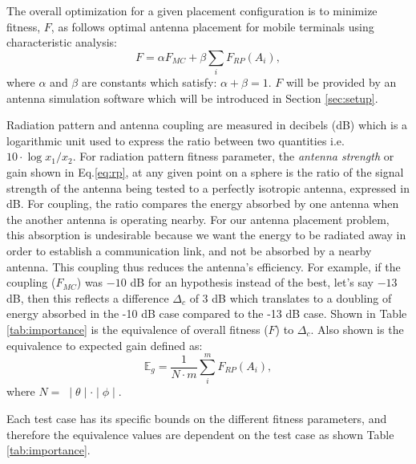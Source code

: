 \documentclass{sig-alternate}
\begin{document}
The overall optimization for a given placement configuration is to minimize fitness, $F$, as follows optimal antenna placement for mobile terminals using characteristic analysis:
\begin{equation} \label{eq:optimal}
  F = \alpha F_{MC} + \beta \sum_{i} F_{RP}(A_i),
\end{equation}
where $\alpha$ and $\beta$ are constants which satisfy: $\alpha + \beta = 1$. $F$ will be provided by an antenna simulation software which will be introduced in Section \ref{sec:setup}.

Radiation pattern and antenna coupling are measured in decibels (dB) which is a logarithmic unit used to express the ratio between two quantities i.e. $10 \cdot \log{x_1 / x_2}$. For radiation pattern fitness parameter, the \textit{antenna strength} or gain shown in Eq.\eqref{eq:rp}, at any given point on a sphere is the ratio of the signal strength of the antenna being tested to a perfectly isotropic antenna, expressed in dB. For coupling, the ratio compares the energy absorbed by one antenna when the another antenna is operating nearby.  For our antenna placement problem, this absorption is undesirable because we want the energy to be radiated away in order to establish a communication link, and not be absorbed by a nearby antenna.  This coupling thus reduces the antenna's efficiency.  For example, if the coupling ($F_{MC}$) was $-10$ dB for an hypothesis instead of the best, let's say $-13$ dB, then this reflects a difference $\Delta_c$ of $3$ dB which translates to a doubling of energy absorbed in the -10 dB case compared to the -13 dB case. Shown in Table \ref{tab:importance} is the equivalence of overall fitness ($F$) to $\Delta_c$. Also shown is the equivalence to expected gain defined as:
\begin{equation}
    \mathbb E_g = \frac{1}{N \cdot m} \sum_{i}^m F_{RP}(A_i),
\end{equation}
where $N = \;\mid \theta \mid \cdot \mid \phi \mid$.

Each test case has its specific bounds on the different fitness parameters, and therefore the equivalence values are dependent on the test case as shown Table \ref{tab:importance}.
\end{document}

